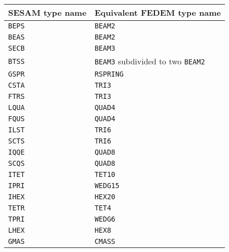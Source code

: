 \medskip
\begin{tabular}{| m{} |  m{} |}
  \hline
  \rowcolor[HTML]{EFEFEF} SESAM type name & Equivalent FEDEM type name \\
  \hline\hline
  {\tt BEPS} & {\tt BEAM2}   \\\hline
  {\tt BEAS} & {\tt BEAM2}   \\\hline
  {\tt SECB} & {\tt BEAM3}   \\\hline
  {\tt BTSS} & {\tt BEAM3} subdivided to two {\tt BEAM2} \\\hline
  {\tt GSPR} & {\tt RSPRING} \\\hline
  {\tt CSTA} & {\tt TRI3}    \\\hline
  {\tt FTRS} & {\tt TRI3}    \\\hline
  {\tt LQUA} & {\tt QUAD4}   \\\hline
  {\tt FQUS} & {\tt QUAD4}   \\\hline
  {\tt ILST} & {\tt TRI6}    \\\hline
  {\tt SCTS} & {\tt TRI6}    \\\hline
  {\tt IQQE} & {\tt QUAD8}   \\\hline
  {\tt SCQS} & {\tt QUAD8}   \\\hline
  {\tt ITET} & {\tt TET10}   \\\hline
  {\tt IPRI} & {\tt WEDG15}  \\\hline
  {\tt IHEX} & {\tt HEX20}   \\\hline
  {\tt TETR} & {\tt TET4}    \\\hline
  {\tt TPRI} & {\tt WEDG6}   \\\hline
  {\tt LHEX} & {\tt HEX8}    \\\hline
  {\tt GMAS} & {\tt CMASS}   \\\hline
\end{tabular}
